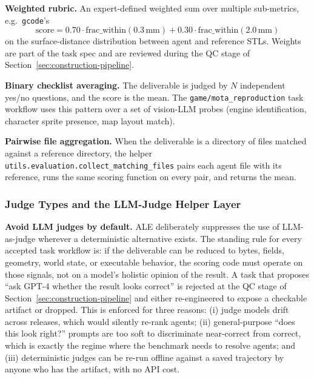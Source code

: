 \noindent \textbf{Weighted rubric.} An expert-defined weighted sum over multiple sub-metrics, e.g.\ \texttt{gcode}'s
\[
    \text{score} = 0.70 \cdot \mathrm{frac\_within}(0.3\,\text{mm}) + 0.30 \cdot \mathrm{frac\_within}(2.0\,\text{mm})
\]
on the surface-distance distribution between agent and reference STLs. Weights are part of the task spec and are reviewed during the QC stage of Section~\ref{sec:construction-pipeline}.

\noindent \textbf{Binary checklist averaging.} The deliverable is judged by $N$ independent yes/no questions, and the score is the mean. The \texttt{game/mota\_reproduction} task workflow uses this pattern over a set of vision-LLM probes (engine identification, character sprite presence, map layout match).

\noindent \textbf{Pairwise file aggregation.} When the deliverable is a directory of files matched against a reference directory, the helper \texttt{utils.evaluation.collect\_matching\_files} pairs each agent file with its reference, runs the same scoring function on every pair, and returns the mean.

\subsubsection{Judge Types and the LLM-Judge Helper Layer}
\label{app:eval-judges}

\noindent \textbf{Avoid LLM judges by default.}
ALE deliberately suppresses the use of LLM-as-judge wherever a deterministic alternative exists. The standing rule for every accepted task workflow is: if the deliverable can be reduced to bytes, fields, geometry, world state, or executable behavior, the scoring code must operate on those signals, not on a model's holistic opinion of the result. A task that proposes ``ask GPT-4 whether the result looks correct'' is rejected at the QC stage of Section~\ref{sec:construction-pipeline} and either re-engineered to expose a checkable artifact or dropped. This is enforced for three reasons: (i) judge models drift across releases, which would silently re-rank agents; (ii) general-purpose ``does this look right?'' prompts are too soft to discriminate near-correct from correct, which is exactly the regime where the benchmark needs to resolve agents; and (iii) deterministic judges can be re-run offline against a saved trajectory by anyone who has the artifact, with no API cost.

